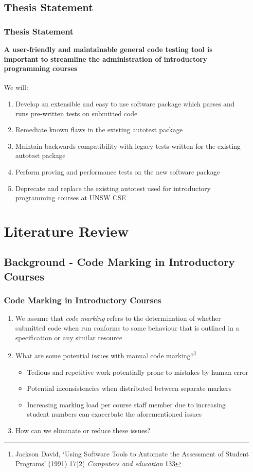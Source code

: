 \documentclass[xcolor]{beamer}
\begin{document}
\subsection{Thesis Statement}
\begin{frame}
	\frametitle{Thesis Statement}
	\textbf{A user-friendly and maintainable general code testing tool is important to streamline the administration of introductory programming courses}
	\\~\\
		\pause
	We will:
		\pause
	\begin{enumerate}
		\item Develop an extensible and easy to use software package which parses and runs pre-written tests on submitted code
			\pause
		\item Remediate known flaws in the existing autotest package
			\pause
		\item Maintain backwards compatibility with legacy tests written for the existing autotest package
			\pause
		\item Perform proving and performance tests on the new software package
			\pause
		\item Deprecate and replace the existing autotest used for introductory programming courses at UNSW CSE
	\end{enumerate}
\end{frame}

\section{Literature Review}
\subsection{Background - Code Marking in Introductory Courses}
\begin{frame}
	\frametitle{Code Marking in Introductory Courses}
	\begin{enumerate}
		\setlength\itemsep{1em}
		\item We assume that \textit{code marking} refers to the determination of whether submitted code when run conforms to some behaviour that is outlined in a specification or any similar resource
			\pause
		\item What are some potential issues with manual code marking?\footnote{Jackson David, ‘Using Software Tools to Automate the Assessment of Student Programs’ (1991) 17(2) \textit{Computers and education} 133}
			\pause
		\begin{itemize}
			\item Tedious and repetitive work potentially prone to mistakes by human error
				\pause
			\item Potential inconsistencies when distributed between separate markers
				\pause
			\item Increasing marking load per course staff member due to increasing student numbers can exacerbate the aforementioned issues
				\pause
		\end{itemize}
		\item How can we eliminate or reduce these issues?
	\end{enumerate}
\end{frame}
\end{document}
